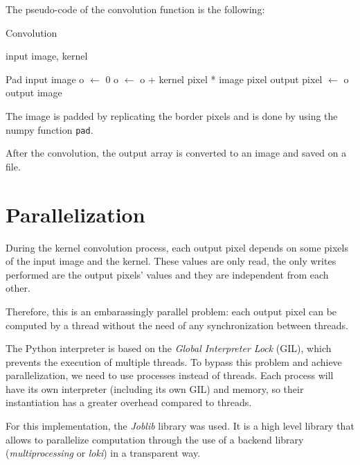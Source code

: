 \documentclass[10pt,twocolumn,letterpaper]{article}
\begin{document}
The pseudo-code of the convolution function is the following:

\begin{algorithm}[H]
	\label{alg:convolution}
	\caption{Convolution}
	\begin{algorithmic}
		\Require input image, kernel
		\vspace{0.5cm}
		
		\State Pad input image
		\State o $\leftarrow$ 0
		\State o $\leftarrow$ o + kernel pixel * image pixel
		\EndFor
		\EndFor
		\State output pixel $\leftarrow$ o
		\EndFor
		\EndFor
		\EndFor
		\State \Return output image
		
	\end{algorithmic}
\end{algorithm}

The image is padded by replicating the border pixels and is done by using the numpy function \verb"pad".

After the convolution, the output array is converted to an image and saved on a file. 

\section{Parallelization}

During the kernel convolution process, each output pixel depends on some pixels of the input image and the kernel. These values are only read, the only writes performed are the output pixels' values and they are independent from each other. 

Therefore, this is an embarassingly parallel problem: each output pixel can be computed by a thread without the need of any synchronization between threads.

The Python interpreter is based on the \textit{Global Interpreter Lock} (GIL), which prevents the execution of multiple threads. To bypass this problem and achieve parallelization, we need to use processes instead of threads.
Each process will have its own interpreter (including its own GIL) and  memory, so their instantiation has a greater overhead compared to threads.

For this implementation, the \textit{Joblib} library was used. It is a high level library that allows to parallelize computation through the use of a backend library (\textit{multiprocessing} or \textit{loki}) in a transparent way.
\end{document}
